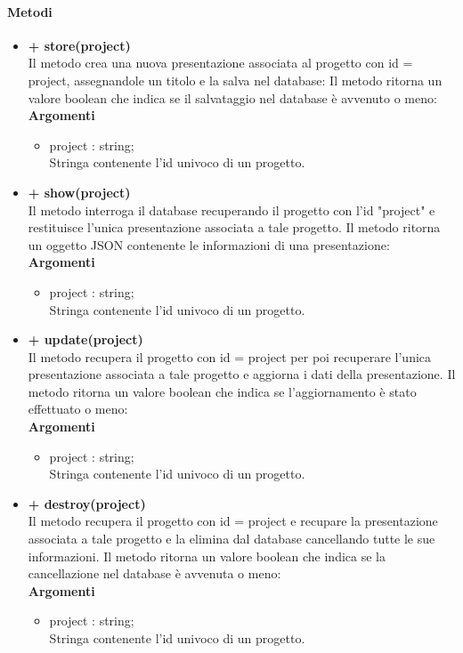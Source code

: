 	\paragraph{Metodi}
		\begin{itemize}
			\item \textbf{+ store(project)}\\
			Il metodo crea una nuova presentazione associata al progetto con id = project, assegnandole un titolo e la salva nel database: Il metodo ritorna un valore boolean che indica se il salvataggio nel database è avvenuto o meno:\\
			\textbf{Argomenti}
			\begin{itemize}
				\item project : string; \\
				Stringa contenente l'id univoco di un progetto.
			\end{itemize}
			\item \textbf{+ show(project)}\\
			Il metodo interroga il database recuperando il progetto con l'id "project" e restituisce l'unica presentazione associata a tale progetto. Il metodo ritorna un oggetto JSON contenente le informazioni di una presentazione:\\
			\textbf{Argomenti}
			\begin{itemize}
				\item project : string; \\
				Stringa contenente l'id univoco di un progetto.
			\end{itemize}
			\item \textbf{+ update(project)}\\
			Il metodo recupera il progetto con id = project per poi recuperare l'unica presentazione associata a tale progetto e aggiorna i dati della presentazione. Il metodo ritorna un valore boolean che indica se l'aggiornamento è stato effettuato o meno:\\
			\textbf{Argomenti}
			\begin{itemize}
				\item project : string; \\
				Stringa contenente l'id univoco di un progetto.
			\end{itemize}
			\item \textbf{+ destroy(project)}\\
			Il metodo recupera il progetto con id = project e recupare la presentazione associata a tale progetto e la elimina dal database cancellando tutte le sue informazioni. Il metodo ritorna un valore boolean che indica se la cancellazione nel database è avvenuta o meno:\\
			\textbf{Argomenti}
			\begin{itemize}
				\item project : string; \\
				Stringa contenente l'id univoco di un progetto.
			\end{itemize}
		\end{itemize}
		
